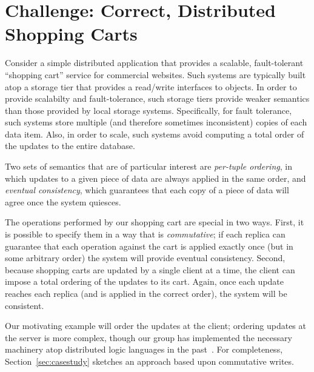 \section{Challenge: Correct, Distributed Shopping Carts}

Consider a simple distributed application that provides a scalable,
fault-tolerant ``shopping cart'' service for commercial websites.
Such systems are typically built atop a storage tier that provides a
read/write interfaces to objects.  In order to provide scalabilty and
fault-tolerance, such storage tiers provide weaker semantics than
those provided by local storage systems.  Specifically, for fault
tolerance, such systems store multiple (and therefore sometimes
inconsistent) copies of each data item.  Also, in order to scale, such
systems avoid computing a total order of the updates to the entire
database.

Two sets of semantics that are of particular interest are {\em
  per-tuple ordering}, in which updates to a given piece of data are
always applied in the same order, and {\em eventual consistency},
which guarantees that each copy of a piece of data will agree once the
system quiesces.

The operations performed by our shopping cart are special in two ways.
First, it is possible to specify them in a way that is {\em
  commutative}; if each replica can guarantee that each operation
against the cart is applied exactly once (but in some arbitrary order)
the system will provide eventual consistency.  Second, because
shopping carts are updated by a single client at a time, the client
can impose a total ordering of the updates to its cart.  Again, once
each update reaches each replica (and is applied in the correct
order), the system will be consistent.

Our motivating example will order the updates at the client; ordering
updates at the server is more complex, though our group has
implemented the necessary machinery atop distributed logic languages
in the past~\cite{bfs-paxos}.  For completeness, Section~\ref{sec:casestudy}
sketches an approach based upon commutative writes.



